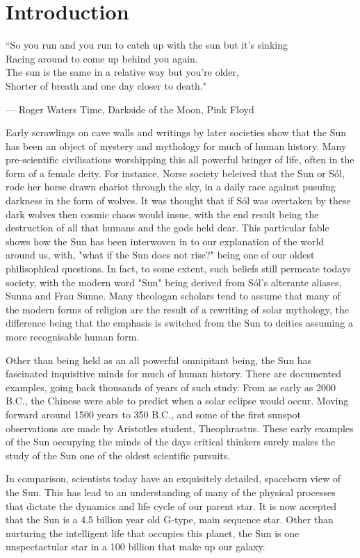\section{Introduction}

\epigraphfontsize{\small\itshape}
\epigraph{``So you run and you run to catch up with the sun but it's sinking \\
Racing around to come up behind you again. \\
The sun is the same in a relative way but you're older, \\
Shorter of breath and one day closer to death."}{--- \textup{Roger Waters} Time, Darkside of the Moon, Pink Floyd}


Early scrawlings on cave walls and writings by later societies show that the Sun has been an object of mystery and mythology for much of human history. Many pre-scientific civilisations worshipping this all powerful bringer of life, often in the form of a female deity. For instance, Norse society beleived that the Sun or Sól, rode her horse drawn chariot through the sky, in a daily race against pusuing darkness in the form of wolves. It was thought that if Sól was overtaken by these dark wolves then cosmic chaos would insue, with the end result being the destruction of all that humans and the gods held dear. This particular fable shows how the Sun has been interwoven in to our explanation of the world around us, with, "what if the Sun does not rise?" being one of our oldest philisophical questions. In fact, to some extent, such beliefs still permeate todays society, with the modern word "Sun" being derived from Sól's alterante aliases, Sunna and Frau Sunne. Many theologan scholars tend to assume that many of the modern forms of religion are the result of a rewriting of solar mythology, the difference being that the emphasis is switched from the Sun to deities assuming a more recognisable human form.  


Other than being held as an all powerful omnipitant being, the Sun has fascinated inquisitive minds for much of human history. There are documented examples, going back thousands of years of such study. From as early as 2000 B.C., the Chinese were able to predict when a solar eclipse would occur. Moving forward around 1500 years to 350 B.C., and some of the first sunspot observations are made by Aristotles student, Theophrastus. These early examples of the Sun occupying the minds of the days critical thinkers surely makes the study of the Sun one of the oldest scientific pursuits.      


In comparison, scientists today have an exquisitely detailed, spaceborn view of the Sun. This has lead to an understanding of many of the physical processes that dictate the dynamics and life cycle of our parent star. It is now accepted that the Sun is a 4.5 billion year old G-type, main sequence star. Other than nurturing the intelligent life that occupies this planet, the Sun is one unspectactular star in a 100 billion that make up our galaxy.
